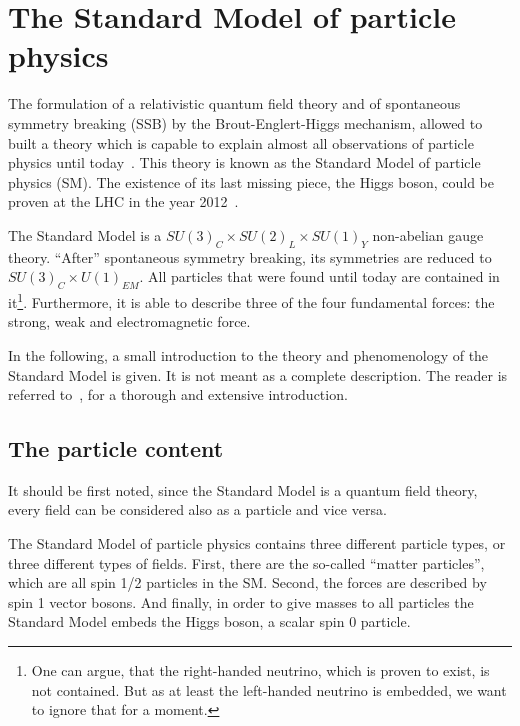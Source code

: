 \chapter{The Standard Model of particle physics}

The formulation of a relativistic quantum field theory and of spontaneous symmetry breaking (SSB) by the Brout-Englert-Higgs mechanism, allowed to built a theory which is capable to explain almost all observations of particle physics until today~\cite{bib:Theory:GFitter}.
This theory is known as the Standard Model of particle physics (SM).
The existence of its last missing piece, the Higgs boson, could be proven at the LHC in the year 2012~\cite{bib:Theory:CMS:HiggsObservation,bib:Theory:Atlas:HiggsObservation}.

The Standard Model is a $SU(3)_C  \times SU(2)_L \times SU(1)_Y$ non-abelian gauge theory.
``After'' spontaneous symmetry breaking, its symmetries are reduced to $SU(3)_C \times U(1)_{EM}$.
All particles that were found until today are contained in it\footnote{One can argue, that the right-handed neutrino, which is proven to exist, is not contained. But as at least the left-handed neutrino is embedded, we want to ignore that for a moment.}.
Furthermore, it is able to describe three of the four fundamental forces: the strong, weak and electromagnetic force.

In the following, a small introduction to the theory and phenomenology of the Standard Model is given.
It is not meant as a complete description.
The reader is referred to~\cite{bib:SM_book_Peskin,bib:SM_book_Ryder,bib:SM_book_Griffiths}, for a thorough and extensive introduction.

\section{The particle content}
It should be first noted, since the Standard Model is a quantum field theory, every field can be considered also as a particle and vice versa.

The Standard Model of particle physics contains three different particle types, or three different types of fields.
First, there are the so-called ``matter particles'', which are all spin 1/2 particles in the SM.
Second, the forces are described by spin 1 vector bosons.
And finally, in order to give masses to all particles the Standard Model embeds the Higgs boson, a scalar spin 0 particle.

